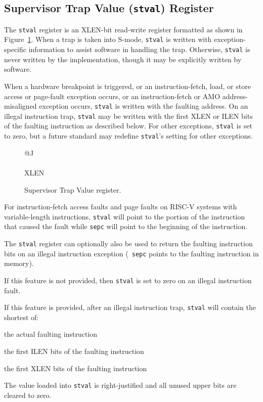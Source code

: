 \subsection{Supervisor Trap Value ({\tt stval}) Register}

The {\tt stval} register is an XLEN-bit read-write register formatted as shown
in Figure~\ref{stvalreg}.  When a trap is taken into S-mode, {\tt stval} is
written with exception-specific information to assist software in handling the
trap.  Otherwise, {\tt stval} is never written by the implementation, though
it may be explicitly written by software.

When a hardware breakpoint is triggered, or an instruction-fetch, load, or
store access or page-fault exception occurs, or an instruction-fetch or AMO
address-misaligned exception occurs, {\tt stval} is written with the
faulting address.  On an illegal instruction trap, {\tt stval} may be
written with the first XLEN or ILEN bits of the faulting instruction as
described below.  For other exceptions, {\tt stval} is set to zero, but a
future standard may redefine {\tt stval}'s setting for other exceptions.

\begin{figure}[h!]
{\footnotesize
\begin{center}
\begin{tabular}{@{}J}
 \\
\hline
{} \\
\hline
XLEN \\
\end{tabular}
\end{center}
}
\vspace{-0.1in}
\caption{Supervisor Trap Value register.}
\label{stvalreg}
\end{figure}

For instruction-fetch access faults and page faults on RISC-V systems with
variable-length instructions, {\tt stval} will point to the portion
of the instruction that caused the fault while {\tt sepc} will point
to the beginning of the instruction.

The {\tt stval} register can optionally also be used to return the
faulting instruction bits on an illegal instruction exception ({\tt
  sepc} points to the faulting instruction in memory).

If this feature is not provided, then {\tt stval} is set to zero on
an illegal instruction fault.

If this feature is provided, after an illegal instruction trap, {\tt stval}
will contain the shortest of:
\begin{compactitem}
\item the actual faulting instruction
\item the first ILEN bits of the faulting instruction
\item the first XLEN bits of the faulting instruction
\end{compactitem}
The value loaded into {\tt stval} is right-justified and all unused upper
bits are cleared to zero.

